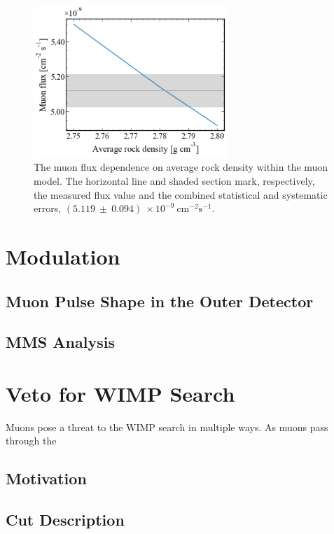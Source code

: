 \begin{figure}[htbp]
    \centering
    \includegraphics[width=0.65\textwidth]{figures/Muons/Flux_density_ws22_ws24.pdf}
    \caption{The muon flux dependence on average rock density within the muon model. The horizontal line and shaded section mark, respectively, the measured flux value and the combined statistical and systematic errors, $(5.119~\pm~0.094)~\times10^{-9}~\textrm{cm}^{-2}\textrm{s}^{-1}$.}
    \label{fig:flux_density}
\end{figure}


\section{Modulation}
\subsection{Muon Pulse Shape in the Outer Detector}
\subsection{MMS Analysis}

\section{Veto for WIMP Search}
Muons pose a threat to the WIMP search in multiple ways. As muons pass through the 
\subsection{Motivation}

\subsection{Cut Description}